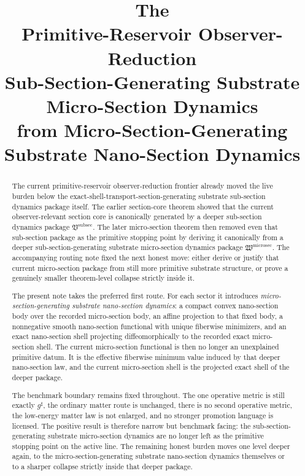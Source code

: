 \documentclass[11pt]{article}
\title{\textbf{The \TheoryName{}}\\[0.4em]
\large Primitive-Reservoir Observer-Reduction\\
\large Sub-Section-Generating Substrate Micro-Section Dynamics\\
\large from Micro-Section-Generating Substrate Nano-Section Dynamics}
\author{}
\date{}
\newcommand{\CompletedMetric}{g^{\sharp}}
\newcommand{\SubSectionPackage}{\mathfrak V^{\mathrm{subsec}}}
\newcommand{\MicroSectionPackage}{\mathfrak W^{\mathrm{microsec}}}
\begin{document}
\maketitle

\begin{abstract}
The current primitive-reservoir observer-reduction frontier already moved the live burden below the exact-shell-transport-section-generating substrate sub-section dynamics package itself. The earlier section-core theorem showed that the current observer-relevant section core is canonically generated by a deeper sub-section dynamics package \(\SubSectionPackage\). The later micro-section theorem then removed even that sub-section package as the primitive stopping point by deriving it canonically from a deeper sub-section-generating substrate micro-section dynamics package \(\MicroSectionPackage\). The accompanying routing note fixed the next honest move: either derive or justify that current micro-section package from still more primitive substrate structure, or prove a genuinely smaller theorem-level collapse strictly inside it.

The present note takes the preferred first route. For each sector it introduces \emph{micro-section-generating substrate nano-section dynamics}: a compact convex nano-section body over the recorded micro-section body, an affine projection to that fixed body, a nonnegative smooth nano-section functional with unique fiberwise minimizers, and an exact nano-section shell projecting diffeomorphically to the recorded exact micro-section shell. The current micro-section functional is then no longer an unexplained primitive datum. It is the effective fiberwise minimum value induced by that deeper nano-section law, and the current micro-section shell is the projected exact shell of the deeper package.

The benchmark boundary remains fixed throughout. The one operative metric is still exactly \(\CompletedMetric\), the ordinary matter route is unchanged, there is no second operative metric, the low-energy matter law is not enlarged, and no stronger promotion language is licensed. The positive result is therefore narrow but benchmark facing: the sub-section-generating substrate micro-section dynamics are no longer left as the primitive stopping point on the active line. The remaining honest burden moves one level deeper again, to the micro-section-generating substrate nano-section dynamics themselves or to a sharper collapse strictly inside that deeper package.
\end{abstract}
\end{document}
